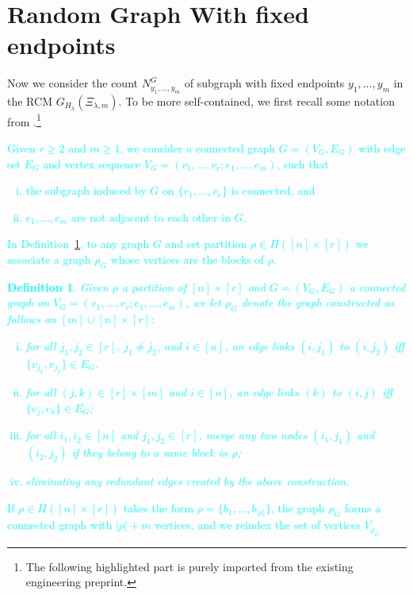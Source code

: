\documentclass[12pt]{article}
\newtheorem{definition}[prop]{Definition}
\numberwithin{equation}{section}
\begin{document}
\section{Random Graph With fixed endpoints}
\noindent
Now we consider the count $N^G_{y_1,\dots,y_m}$ of subgraph with fixed endpoints $y_1,\dots,y_m$ in the RCM $G_{H_\lambda}(\Xi_{\lambda,m})$. To be more self-contained, we first recall some notation from \cite{LiuPrivault2}.\footnote{The following highlighted part is purely imported from the existing engineering preprint.}
\textcolor{cyan}{
Given $r\geq 2$ and $m\geq 1$, we 
consider a connected graph $G=(V_G,E_G)$ with edge set $E_G$ and
vertex sequence 
$V_G=(v_1, \ldots ,v_r; e_1,\ldots , e_m)$, such that
\begin{enumerate}[i)]
\item the subgraph induced by $G$ on $\{v_1, \ldots ,v_r\}$ is connected, and 
\item $e_1, \ldots ,e_m$ are not adjacent to each other in $G$. 
\end{enumerate}
In Definition~\ref{defgraph1},
 to any graph $G$ and set partition $\rho\in\Pi ([n]\times[r])$
we associate a graph $\rho_G$ whose vertices are the blocks of $\rho$.
\begin{definition}
  \label{defgraph1}
  Given $\rho$ a partition of $[n]\times[r]$
  and $G=(V_G,E_G)$ a connected graph 
  on $V_G=(v_1, \ldots ,v_r; e_1,\ldots , e_m)$, 
  we let $\rho_G$ denote the graph 
  constructed as follows on $[m] \cup [n]\times [r]$:
\begin{enumerate}[i)]  
\item for all $j_1, j_2\in [r]$, $j_1\not= j_2$, and $i\in [n]$, 
 an edge links $(i,j_1)$ to $(i,j_2)$
 iff $\{v_{j_1},v_{j_2}\}\in E_G$. 
\item for all $(j,k)\in [r]\times [m]$ and $i\in [n]$, an edge
 links $(k)$ to $(i,j)$ iff $\{v_j,e_k\}\in E_G$; 
\item for all $i_1,i_2\in [n]$
 and $j_1,j_2\in [r]$,
 merge any two nodes $(i_1,j_1)$ and $(i_2,j_2)$ 
 if they belong to a same block in $\rho$;  
\item eliminating any redundant edges created by the above construction.
\end{enumerate}
\end{definition}
\noindent
If $\rho\in\Pi ([n]\times[r])$
takes the form $\rho = \{ b_1,\ldots , b_{|\rho |}\}$, 
the graph $\rho_G$ forms a connected graph with
$|\rho | + m$ vertices, and we reindex the set of vertices $V_{\rho_G}$
}
\end{document}
